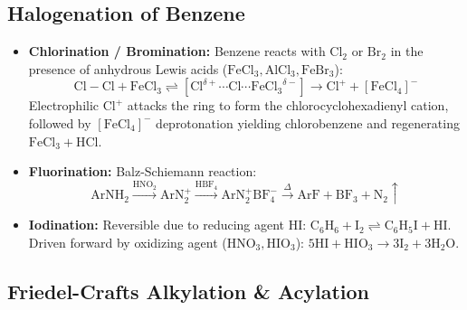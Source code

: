 \documentclass[10pt,twoside,openright]{book}
\begin{document}
\subsection{Halogenation of Benzene}

\begin{formulabox}
\begin{itemize}
  \item \textbf{Chlorination / Bromination:} Benzene reacts with $\mathrm{Cl_2}$ or $\mathrm{Br_2}$ in the presence of anhydrous Lewis acids ($\mathrm{FeCl_3, AlCl_3, FeBr_3}$):
  \begin{equation}
    \mathrm{Cl-Cl} + \mathrm{FeCl_3} \rightleftharpoons [\mathrm{Cl}^{\delta+}\cdots\mathrm{Cl}\cdots\mathrm{FeCl_3}^{\delta-}] \to \mathrm{Cl^+} + [\mathrm{FeCl_4}]^-
  \end{equation}
  Electrophilic $\mathrm{Cl^+}$ attacks the ring to form the chlorocyclohexadienyl cation, followed by $\mathrm{[FeCl_4]^-}$ deprotonation yielding chlorobenzene and regenerating $\mathrm{FeCl_3} + \mathrm{HCl}$.
  \item \textbf{Fluorination:} Balz-Schiemann reaction:
  \begin{equation*}
    \mathrm{ArNH_2} \xrightarrow{\mathrm{HNO_2}} \mathrm{ArN_2^+} \xrightarrow{\mathrm{HBF_4}} \mathrm{ArN_2^+BF_4^-} \xrightarrow{\Delta} \mathrm{ArF} + \mathrm{BF_3} + \mathrm{N_2}\uparrow
  \end{equation*}
  \item \textbf{Iodination:} Reversible due to reducing agent $\mathrm{HI}$:
  $\mathrm{C_6H_6} + \mathrm{I_2} \rightleftharpoons \mathrm{C_6H_5I} + \mathrm{HI}$.
  Driven forward by oxidizing agent ($\mathrm{HNO_3, HIO_3}$):
  $5\mathrm{HI} + \mathrm{HIO_3} \to 3\mathrm{I_2} + 3\mathrm{H_2O}$.
\end{itemize}
\end{formulabox}

\subsection{Friedel-Crafts Alkylation \& Acylation}
\end{document}
